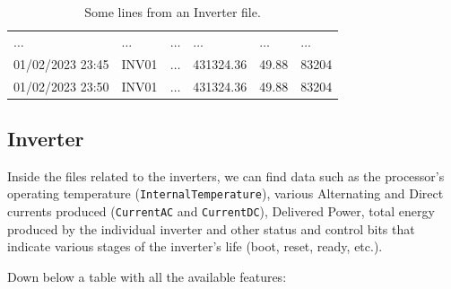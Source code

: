 \begin{table}[H]
\begin{center}
\begin{tabular}[c]{l|l|l|l|l|l}
			$\ldots$                                &
			$\ldots$                                &
			$\ldots$                                &
			$\ldots$                                &
			$\ldots$                                &
			$\ldots$                                           \\
			01/02/2023 23:45                        &
			INV01                                   &
			$\ldots$                                &
			431324.36                               &
			49.88                                   &
			83204                                              \\
			01/02/2023 23:50                        &
			INV01                                   &
			$\ldots$                                &
			431324.36                               &
			49.88                                   &
			83204                                              \\
			\hline
		\end{tabular}
		\caption{Some lines from an Inverter file.}\label{tab:invsunto}
	\end{center}
\end{table}

\subsection{Inverter}
Inside the files related to the inverters, we can find data such as
the processor's operating temperature
(\verb|InternalTemperature|), various Alternating and Direct currents
produced (\verb|CurrentAC| and \verb|CurrentDC|), Delivered Power,
total energy produced by the individual inverter and other status
and control bits that indicate various stages of the inverter's
life (boot, reset, ready, etc.).

Down below a table with all the available features:


